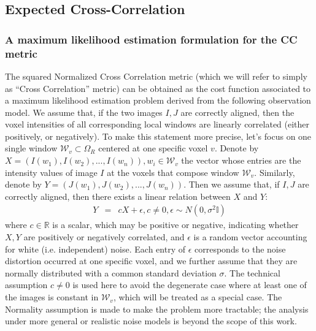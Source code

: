 
\subsection{Expected Cross-Correlation}\label{sec:syn_ecc}

\subsubsection{A maximum likelihood estimation formulation for the CC metric}
The squared Normalized Cross Correlation metric (which we will refer to simply as ``Cross Correlation'' metric) can be obtained as the cost function associated to a maximum likelihood estimation problem derived from the following observation model. We assume that, if the two images $I, J$ are correctly aligned, then the voxel intensities of all corresponding local windows are linearly correlated (either positively, or negatively). To make this statement more precise, let's focus on one single window $\mathcal{W}_{v}\subset\Omega_{R}$ centered at one specific voxel $v$. Denote by $X = (I(w_{1}), I(w_{2}), ..., I(w_{n})), w_{i}\in\mathcal{W}_{v}$ the vector whose entries are the intensity values of image $I$ at the voxels that compose window $\mathcal{W}_{v}$. Similarly, denote by $Y = (J(w_{1}), J(w_{2}), ..., J(w_{n}))$. Then we assume that, if $I, J$ are correctly aligned, then there exists a linear relation between $X$ and $Y$:
\begin{equation}\label{eq:local_linearity_assumption}
    \begin{array}{lcl}
        Y &=& cX + \epsilon, c \neq 0, \epsilon \sim N(0, \sigma^{2}\mathbb{I})
    \end{array}
\end{equation}
where $c\in\mathbb{R}$ is a scalar, which may be positive or negative, indicating whether $X,Y$ are positively or negatively correlated, and $\epsilon$ is a random vector accounting for white (i.e. independent) noise. Each entry of $\epsilon$ corresponds to the noise distortion occurred at one specific voxel, and we further assume that they are normally distributed with a common standard deviation $\sigma$. The technical assumption $c \neq 0$ is used here to avoid the degenerate case where at least one of the images is constant in $\mathcal{W}_{v}$, which will be treated as a special case. The Normality assumption is made to make the problem more tractable; the analysis under more general or realistic noise models is beyond the scope of this work.\\


